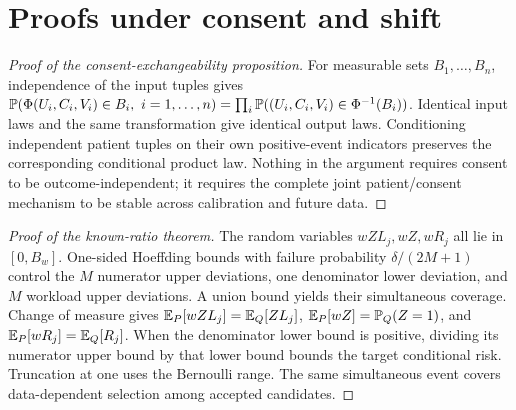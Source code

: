 \section*{Proofs under consent and shift}
\begin{proof}[Proof of the consent-exchangeability proposition]
For measurable sets $B_1,\ldots,B_n$, independence of the input tuples gives
$\Pp(\Phi(U_i,C_i,V_i)\in B_i,\ i=1,\ldots,n)=\prod_i\Pp((U_i,C_i,V_i)\in\Phi^{-1}(B_i))$.
Identical input laws and the same transformation give identical output laws. Conditioning independent patient tuples on their own positive-event indicators preserves the corresponding conditional product law. Nothing in the argument requires consent to be outcome-independent; it requires the complete joint patient/consent mechanism to be stable across calibration and future data.
\end{proof}
\begin{proof}[Proof of the known-ratio theorem]
The random variables $wZL_j,wZ,wR_j$ all lie in $[0,B_w]$. One-sided Hoeffding bounds with failure probability $\delta/(2M+1)$ control the $M$ numerator upper deviations, one denominator lower deviation, and $M$ workload upper deviations. A union bound yields their simultaneous coverage. Change of measure gives $\mathbb E_P[wZL_j]=\mathbb E_Q[ZL_j]$, $\mathbb E_P[wZ]=\mathbb P_Q(Z=1)$, and $\mathbb E_P[wR_j]=\mathbb E_Q[R_j]$. When the denominator lower bound is positive, dividing its numerator upper bound by that lower bound bounds the target conditional risk. Truncation at one uses the Bernoulli range. The same simultaneous event covers data-dependent selection among accepted candidates.
\end{proof}
